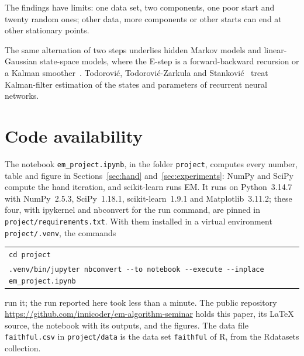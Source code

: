 \documentclass[11pt,a4paper]{amsart}
\numberwithin{equation}{section}
\theoremstyle{plain}
\theoremstyle{definition}
\theoremstyle{remark}
\newcommand{\code}[1]{\texttt{#1}}
\begin{document}
The findings have limits: one data set, two components, one poor start
and twenty random ones; other data, more components or other starts can
end at other stationary points.

The same alternation of two steps underlies hidden Markov models and
linear-Gaussian state-space models, where the E-step is a
forward-backward recursion or a Kalman
smoother~\cite[Chapter~13]{bishop2006}. Todorović, Todorović-Zarkula
and Stanković~\cite{todorovic2012} treat Kalman-filter estimation of the
states and parameters of recurrent neural networks.

\section*{Code availability}

The notebook \nolinkurl{em_project.ipynb}, in the folder
\nolinkurl{project}, computes every number, table and figure in
Sections~\ref{sec:hand} and~\ref{sec:experiments}: NumPy and SciPy
compute the hand iteration, and scikit-learn runs EM. It runs on
Python~3.14.7 with NumPy~2.5.3, SciPy~1.18.1, scikit-learn~1.9.1 and
Matplotlib~3.11.2; these four, with ipykernel and nbconvert for the run
command, are pinned in \nolinkurl{project/requirements.txt}. With them
installed in a virtual environment \nolinkurl{project/.venv}, the
commands
\begin{center}\scriptsize
\begin{tabular}{@{}l@{}}
  \code{cd project}\\
  \code{.venv/bin/jupyter nbconvert -{}-to notebook -{}-execute
    -{}-inplace em\_project.ipynb}
\end{tabular}
\end{center}
run it; the run reported here took less than a minute. The public
repository \url{https://github.com/innicoder/em-algorithm-seminar} holds
this paper, its LaTeX source, the notebook with its outputs, and the
figures. The data file \nolinkurl{faithful.csv} in
\nolinkurl{project/data} is the data set \code{faithful} of R, from the
Rdatasets collection.

\printbibliography
\end{document}
